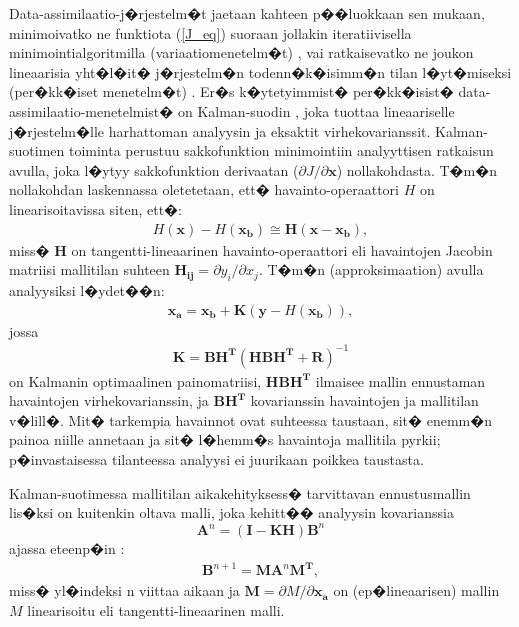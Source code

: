 \documentclass[12pt,a4paper,finnish,margin=2in]{article}
\begin{document}
Data-assimilaatio-j�rjestelm�t jaetaan kahteen p��luokkaan sen mukaan, minimoivatko ne funktiota (\ref{J_eq}) suoraan jollakin iteratiivisella minimointialgoritmilla (variaatiomenetelm�t) \citep[esim.][]{talagrand_2010}, vai ratkaisevatko ne joukon lineaarisia yht�l�it� j�rjestelm�n todenn�k�isimm�n tilan l�yt�miseksi (per�kk�iset menetelm�t) \citep[esim.][]{bertino_2003}. Er�s k�ytetyimmist� per�kk�isist� data-assimilaatio-menetelmist� on Kalman-suodin \citep{kalman_1960}, joka tuottaa lineaariselle j�rjestelm�lle harhattoman analyysin ja eksaktit virhekovarianssit. Kalman-suotimen toiminta perustuu sakkofunktion minimointiin analyyttisen ratkaisun avulla, joka l�ytyy sakkofunktion derivaatan ($\partial J / \partial \mathbf{x}$) nollakohdasta. T�m�n nollakohdan laskennassa oletetetaan, ett� havainto-operaattori $H$ on linearisoitavissa siten, ett�:
\begin{align} \label{tanglin_eq}
H(\mathbf{x})-H(\mathbf{x_b}) \cong \mathbf{H}(\mathbf{x-x_b}),
\end{align}
miss� $\mathbf{H}$ on tangentti-lineaarinen havainto-operaattori eli havaintojen Jacobin matriisi mallitilan suhteen $\mathbf{H_{ij}} = \partial y_i / \partial x_j$. T�m�n (approksimaation) avulla analyysiksi l�ydet��n:
\begin{align} \label{xa_eq}
\mathbf{x_a} = \mathbf{x_b} + \mathbf{K}(\mathbf{y} - H(\mathbf{x_b})),
\end{align}
jossa 
\begin{align} \label{K_eq}
\mathbf{K} = \mathbf{B H^T}(\mathbf{HBH^T} + \mathbf{R})^{-1}
\end{align}
on Kalmanin optimaalinen painomatriisi, $\mathbf{HBH^T}$ ilmaisee mallin ennustaman havaintojen virhekovarianssin, ja $\mathbf{BH^T}$ kovarianssin havaintojen ja mallitilan v�lill�. Mit� tarkempia havainnot ovat suhteessa taustaan, sit� enemm�n painoa niille annetaan ja sit� l�hemm�s havaintoja mallitila pyrkii; p�invastaisessa tilanteessa analyysi ei juurikaan poikkea taustasta.

Kalman-suotimessa mallitilan aikakehityksess� tarvittavan ennustusmallin lis�ksi on kuitenkin oltava malli, joka kehitt�� analyysin kovarianssia 
\begin{equation} \label{analysis_cov_eq}
\mathbf{A}^n\mathbf{ = (I-KH)B}^{n}
\end{equation}
ajassa eteenp�in \citep[esim.][]{kalnay_2010}:
\begin{align} \label{time_evol_eq}
\mathbf{B}^{n+1} = \mathbf{MA}^n\mathbf{M^T},
\end{align}
miss� yl�indeksi n viittaa aikaan ja $\mathbf{M} = \partial M / \partial \mathbf{x_a}$ on (ep�lineaarisen) mallin $M$ linearisoitu eli tangentti-lineaarinen malli. 
\end{document}
